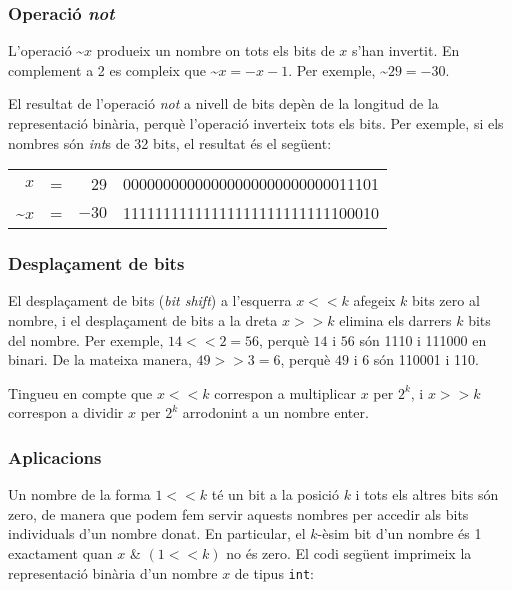 \subsubsection{Operació \emph{not}}


L'operació  \textasciitilde$x$ produeix un nombre on tots els
bits de $x$ s'han invertit. En complement a 2 es compleix que
\textasciitilde$x = -x-1$. Per exemple, \textasciitilde$29 = -30$.

El resultat de l'operació \emph{not} a nivell de bits depèn de la
longitud de la representació binària, perquè l'operació inverteix tots
els bits. Per exemple, si els nombres són \emph{int}s de 32 bits, el
resultat és el següent:


\begin{center}
\begin{tabular}{rrrr}
$x$ & = & 29 &   00000000000000000000000000011101 \\
\textasciitilde$x$ & = & $-30$ & 11111111111111111111111111100010 \\
\end{tabular}
\end{center}


\subsubsection{Desplaçament de bits}


El desplaçament de bits (\emph{bit shift}) a l'esquerra $x < < k$
afegeix $k$ bits zero al nombre, i el desplaçament de bits a la dreta
$x > > k$ elimina els darrers $k$ bits del nombre. Per exemple, $14 < <
2 = 56$, perquè $14$ i $56$ són 1110 i 111000 en binari. De la mateixa
manera, $49 > > 3 = 6$, perquè $49$ i $6$ són 110001 i 110.

Tingueu en compte que $x < < k$ correspon a multiplicar $x$ per $2^k$,
i $x > > k$ correspon a dividir $x$ per $2^k$ arrodonint a un nombre
enter.

\subsubsection{Aplicacions}

Un nombre de la forma $1 < < k$ té un bit a la posició $k$ i tots els
altres bits són zero, de manera que podem fem servir aquests nombres
per accedir als bits individuals d'un nombre donat. En particular, el
$k$-èsim bit d'un nombre és 1 exactament quan $x$ \& $(1 < < k)$ no
és zero. El codi següent imprimeix la representació binària d'un
nombre $x$ de tipus \texttt{int}:


